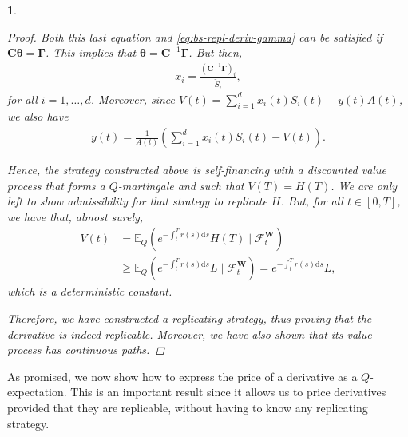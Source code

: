 \documentclass[english]{article}
\numberwithin{equation}{section}
\numberwithin{figure}{section}
\theoremstyle{bolddescit}
\newtheorem{theorem}{\protect\theoremname}[section]
\theoremstyle{definition}
\theoremstyle{definition}
\theoremstyle{plain}
\theoremstyle{plain}
\theoremstyle{bolddesc}
\theoremstyle{plain}
\theoremstyle{remark}
\providecommand{\theoremname}{Theorem}
\begin{document}
\begin{theorem}
\begin{proof}
    Both this last equation and \eqref{eq:bs-repl-deriv-gamma} can be satisfied if $\mathbf{C} \mathbf{\theta} = \mathbf{\Gamma}$. This implies that $\mathbf{\theta} = \mathbf{C}^{-1} \mathbf{\Gamma}$. But then,
    \begin{align*}
      x_i = \frac{(\mathbf{C}^{-1} \mathbf{\Gamma})_i}{\widetilde{S}_i},
    \end{align*}
    for all $i=1,\ldots,d$. Moreover, since $V(t) = \sum_{i=1}^d x_i(t) S_i(t) + y(t) A(t)$, we also have
    \begin{align*}
      y(t) = \frac{1}{A(t)} \left(\sum_{i=1}^d x_i(t) S_i(t) - V(t)\right).
    \end{align*}

    Hence, the strategy constructed above is self-financing with a discounted value process that forms a $Q$-martingale and such that $V(T) = H(T)$. We are only left to show admissibility for that strategy to replicate $H$. But, for all $t \in [0,T]$, we have that, almost surely,
    \begin{align*}
      V(t) &= \mathbb{E}_Q\left(e^{-\int_t^T r(s) \mathrm{d}s} H(T) \mid \mathcal{F}^\mathbf{W}_t\right)\\
      &\ge \mathbb{E}_Q\left(e^{-\int_t^T r(s) \mathrm{d}s} L \mid \mathcal{F}^\mathbf{W}_t\right)
      = e^{-\int_t^T r(s) \mathrm{d}s} L,
    \end{align*}
    which is a deterministic constant.

    Therefore, we have constructed a replicating strategy, thus proving that the derivative is indeed replicable. Moreover, we have also shown that its value process has continuous paths.
  \end{proof}
\end{theorem}

As promised, we now show how to express the price of a derivative as a $Q$-expectation. This is an important result since it allows us to price derivatives provided that they are replicable, without having to know any replicating strategy.
\end{document}
